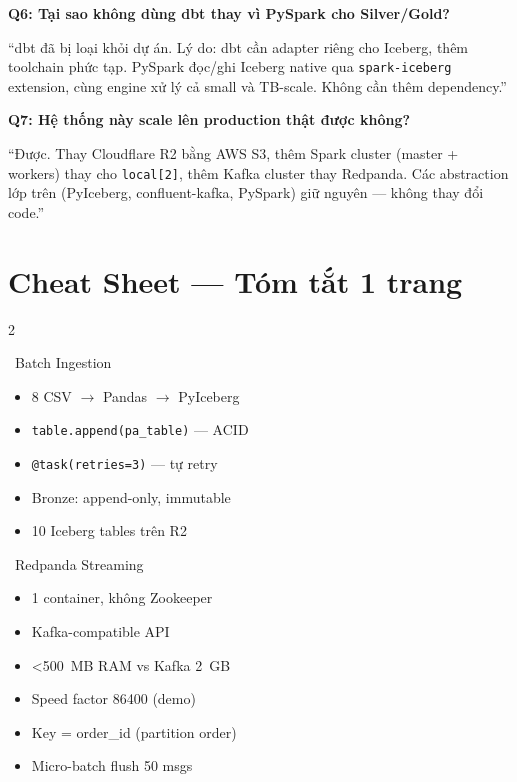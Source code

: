 \documentclass[12pt, a4paper]{article}
\newcommand{\code}[1]{\texttt{\small#1}}
\begin{document}
\begin{tcolorbox}[colback=gray!5, colframe=gray!50, arc=4pt,
  title={\faQuestion\ 7 câu hỏi thầy cô hay hỏi}]
\textbf{Q6: Tại sao không dùng dbt thay vì PySpark cho Silver/Gold?}

\begin{scriptbox}
``dbt đã bị loại khỏi dự án. Lý do: dbt cần adapter riêng cho
Iceberg, thêm toolchain phức tạp. PySpark đọc/ghi Iceberg native qua
\code{spark-iceberg} extension, cùng engine xử lý cả small và TB-scale.
Không cần thêm dependency.''
\end{scriptbox}

\textbf{Q7: Hệ thống này scale lên production thật được không?}

\begin{scriptbox}
``Được. Thay Cloudflare R2 bằng AWS S3, thêm Spark cluster (master +
workers) thay cho \code{local[2]}, thêm Kafka cluster thay Redpanda. Các
abstraction lớp trên (PyIceberg, confluent-kafka, PySpark) giữ nguyên ---
không thay đổi code.''
\end{scriptbox}

\end{tcolorbox}

\newpage

\section{Cheat Sheet --- Tóm tắt 1 trang}

\begin{multicols}{2}

\begin{keybox}{\faBolt\ Batch Ingestion}
\begin{itemize}[leftmargin=1em, itemsep=2pt, topsep=2pt]
  \item 8 CSV $\to$ Pandas $\to$ PyIceberg
  \item \code{table.append(pa\_table)} --- ACID
  \item \code{@task(retries=3)} --- tự retry
  \item Bronze: append-only, immutable
  \item 10 Iceberg tables trên R2
\end{itemize}
\end{keybox}

\columnbreak

\begin{keybox}{\faRss\ Redpanda Streaming}
\begin{itemize}[leftmargin=1em, itemsep=2pt, topsep=2pt]
  \item 1 container, không Zookeeper
  \item Kafka-compatible API
  \item \textless500~MB RAM vs Kafka 2~GB
  \item Speed factor 86400 (demo)
  \item Key = order\_id (partition order)
  \item Micro-batch flush 50 msgs
\end{itemize}
\end{keybox}

\end{multicols}
\end{document}
